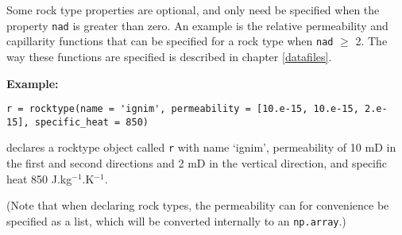 Some rock type properties are optional, and only need be specified when the property \texttt{nad} is greater than zero.  An example is the relative permeability and capillarity functions that can be specified for a rock type when \texttt{nad} $\ge$ 2.  The way these functions are specified is described in chapter \ref{datafiles}.

\textbf{Example:}

\begin{lstlisting}
r = rocktype(name = 'ignim', permeability = [10.e-15, 10.e-15, 2.e-15], specific_heat = 850)
\end{lstlisting}

declares a rocktype object called \texttt{r} with name `ignim', permeability of 10 mD in the first and second directions and 2 mD in the vertical direction, and specific heat 850 J.kg$^{-1}$.K$^{-1}$.

(Note that when declaring rock types, the permeability can for convenience be specified as a list, which will be converted internally to an \texttt{np.array}.)

